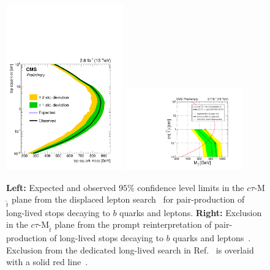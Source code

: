 \begin{figure}[h]
\begin{center}
\includegraphics[width=0.45\textwidth,angle=0]{ch5-figures/CMS-PAS-EXO-16-022_Figure_004.pdf}
\includegraphics[width=0.45\textwidth,angle=0]{ch5-figures/CMS-PAS-EXO-16-007_Figure-aux_001.pdf}
\end{center}
\caption{{\bf Left:} Expected and observed $95\%$ confidence level limits in the $c\tau$-M$_{\tilde{t}}$ plane from the displaced lepton search~\cite{CMS-PAS-EXO-16-022} for pair-production of long-lived stops decaying to $b$ quarks and leptons. {\bf Right:} Exclusion in the $c\tau$-M$_{\tilde{t}}$ plane from the prompt reinterpretation of pair-production of long-lived stops decaying to $b$ quarks and leptons~\cite{CMS-PAS-EXO-16-007}. Exclusion from the dedicated long-lived search in Ref.~\cite{CMS-PAS-EXO-16-022} is overlaid with a solid red line~\cite{CMS-EXO-16-007url}.}
\label{fig:exo-16}
\end{figure}


